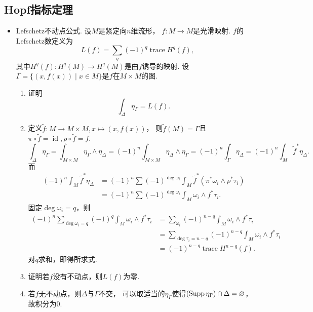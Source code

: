 \subsection{Hopf指标定理}
\begin{itemize}


    \item[11.26] Lefschetz不动点公式. 设$M$是紧定向$n$维流形，
    $f:M\rightarrow M$是光滑映射. $f$的Lefschetz数定义为
        $$L(f)=\sum_{q}(-1)^q \operatorname{trace}H^q(f),$$
    其中$H^q(f):H^q(M)\rightarrow H^q(M)$是由$f$诱导的映射. 
    设$\Gamma=\{(x,f(x))\mid x\in M\}$是$f$在$M\times M$的图.
    \begin{enumerate}
        \item[(a)] 证明\[\int_{\Delta} \eta_{\Gamma}=L(f).\]
        \item[\textbf{证明:}] \qquad 定义$\tilde{f}:M\rightarrow M\times M, x\mapsto (x,f(x))$，
        则$\tilde{f}(M)=\Gamma$且$\pi\circ \tilde{f}=\operatorname{id}, \rho\circ \tilde{f}=f$.
            $$\int_{\Delta} \eta_\Gamma =\int_{M\times M}\eta_\Gamma\wedge \eta_\Delta
            =(-1)^n \int_{M\times M} \eta_\Delta\wedge \eta_\Gamma
            =(-1)^n \int_\Gamma \eta_\Delta=(-1)^n \int_M \tilde{f}^*\eta_\Delta.$$
        而
            \begin{align*}
                (-1)^n \int_M\tilde{f}^*\eta_\Delta 
                &=(-1)^n \sum (-1)^{\deg \omega_i} \int_M \tilde{f}^*(\pi^*\omega_i \wedge \rho^*\tau_i)\\
                &=(-1)^n \sum (-1)^{\deg \omega_i} \int_M \omega_i \wedge f^*\tau_i.
            \end{align*}
        固定$\deg \omega_i=q$，则
            \begin{align*}
                (-1)^n \sum\limits_{\deg \omega_i=q} (-1)^q \int_M \omega_i \wedge f^*\tau_i
                &=\sum\limits_{\omega_i} (-1)^{n-q}\int_M \omega_i \wedge f^*\tau_i\\
                &=\sum\limits_{\deg \tau_i=n-q} (-1)^{n-q} \int_M \omega_i\wedge f^*\tau_i\\
                &=(-1)^{n-q} \operatorname{trace}H^{n-q}(f).
            \end{align*}
        对$q$求和，即得所求式.
        \item[(b)] 证明若$f$没有不动点，则$L(f)$为零.
        \item[\textbf{证明:}] 若$f$无不动点，则$\Delta$与$\Gamma$不交，
        可以取适当的$\eta_\Gamma$使得$(\operatorname{Supp}\eta_\Gamma) \cap \Delta=\varnothing$，故积分为$0$.


\end{enumerate}
\end{itemize}
